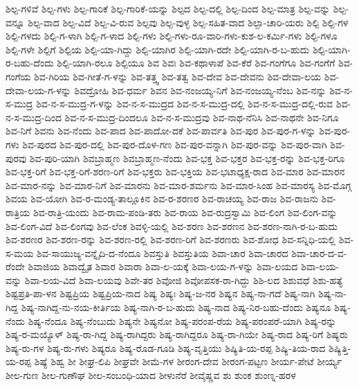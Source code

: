 ಶಿಲ್ಪ-ಗಳಿವೆ
ಶಿಲ್ಪ-ಗಳು
ಶಿಲ್ಪ-ಗಾರಿಕೆ
ಶಿಲ್ಪ-ಗಾರಿಕೆ-ಯನ್ನು
ಶಿಲ್ಪದ
ಶಿಲ್ಪ-ದಲ್ಲಿ
ಶಿಲ್ಪ-ದಿಂದ
ಶಿಲ್ಪ-ಮಾತ್ರ
ಶಿಲ್ಪ-ವನ್ನು
ಶಿಲ್ಪ-ವನ್ನೂ
ಶಿಲ್ಪ-ವಾದ
ಶಿಲ್ಪ-ವಿದೆ
ಶಿಲ್ಪ-ವಿ-ರುವ
ಶಿಲ್ಪವು
ಶಿಲ್ಪ-ವುಳ್ಳ
ಶಿಲ್ಪ-ಸಹಿತ-ವಾದ
ಶಿಲ್ಪಾ-ಚಾರಿ-ಯರು
ಶಿಲ್ಪಿ
ಶಿಲ್ಪಿ-ಗಳ
ಶಿಲ್ಪಿ-ಗಳದು
ಶಿಲ್ಪಿ-ಗ-ಳಾಗಿ
ಶಿಲ್ಪಿ-ಗ-ಳಾದ
ಶಿಲ್ಪಿ-ಗಳು
ಶಿಲ್ಪಿ-ಗಳು-ರೂ-ವಾರಿ-ಗಳು-ಕುಶ-ಲ-ಕರ್ಮಿ-ಗಳು
ಶಿಲ್ಪಿ-ಗಳೂ
ಶಿಲ್ಪಿ-ಗಳೇ
ಶಿಲ್ಪಿಗೆ
ಶಿಲ್ಪಿಯ
ಶಿಲ್ಪಿ-ಯಾ-ಗಿದ್ದು
ಶಿಲ್ಪಿ-ಯಾಗಿರ
ಶಿಲ್ಪಿ-ಯಾಗಿ-ರದೇ
ಶಿಲ್ಪಿ-ಯಾಗಿ-ರ-ಬ-ಹುದು
ಶಿಲ್ಪಿ-ಯಾಗಿ-ರ-ಬಹು-ದೆಂದು
ಶಿಲ್ಪಿ-ಯಾಗಿ-ರಲೂ
ಶಿಲ್ಪಿಯೂ
ಶಿವ
ಶಿವಃ
ಶಿವ-ಕಥಾಳಾಪೆ
ಶಿವ-ಕೆರೆ
ಶಿವ-ಗಂಗೆಗೂ
ಶಿವ-ಗಂಗೆಗೆ
ಶಿವ-ಗಂಗೆಯ
ಶಿವ-ಗಿರಿಯ
ಶಿವ-ಗೀತೆ-ಗ-ಳನ್ನು
ಶಿವ-ತತ್ತ್ವ
ಶಿವ-ತತ್ವ
ಶಿವ-ದೇವ
ಶಿವ-ದೇವನು
ಶಿವ-ದೇವಾ-ಲಯ
ಶಿವ-ದೇವಾ-ಲಯ-ಗ-ಳನ್ನು
ಶಿವದ್ರೋಹಿ
ಶಿವ-ಧರ್ಮ
ಶಿವನ
ಶಿವ-ನಂಜಯ್ಯ-ನಿಗೆ
ಶಿವ-ನಂಜಯ್ಯ-ನೆಂಬ
ಶಿವ-ನನ್ನು
ಶಿವ-ನ-ಸ-ಮುದ್ರ
ಶಿವ-ನ-ಸ-ಮುದ್ರ-ಗ-ಳನ್ನು
ಶಿವ-ನ-ಸ-ಮುದ್ರದ
ಶಿವ-ನ-ಸ-ಮುದ್ರ-ದಲ್ಲಿ
ಶಿವ-ನ-ಸ-ಮುದ್ರ-ದಲ್ಲಿ-ರುವ
ಶಿವ-ನ-ಸ-ಮುದ್ರ-ದಿಂದ
ಶಿವ-ನ-ಸ-ಮುದ್ರ-ದಿಂದಲೂ
ಶಿವ-ನ-ಸ-ಮುದ್ರವು
ಶಿವ-ನಾಥ-ನೆನಿಸಿ
ಶಿವ-ನಾಥನೇ
ಶಿವ-ನಿಗೂ
ಶಿವ-ನಿಗೆ
ಶಿವನು
ಶಿವ-ನೆಂದು
ಶಿವ-ಪಾದ
ಶಿವ-ಪಾದೋ-ದಕೆ
ಶಿವ-ಪಾರ್ವತಿ
ಶಿವ-ಪುರ
ಶಿವ-ಪುರ-ಗ-ಳನ್ನು
ಶಿವ-ಪುರ-ಗಳು
ಶಿವ-ಪುರದ
ಶಿವ-ಪುರ-ದಲ್ಲಿ
ಶಿವ-ಪುರ-ದೊಳ-ಗಣ
ಶಿವ-ಪುರ-ವನ್ನಾಗಿ
ಶಿವ-ಪುರ-ವನ್ನು
ಶಿವ-ಪುರ-ವಾಗಿ
ಶಿವ-ಪುರವು
ಶಿವ-ಪುರಿ-ಯಾಗಿ
ಶಿವಬ್ರಾಹ್ಮಣ
ಶಿವಬ್ರಾಹ್ಮಣ-ನೆಂದು
ಶಿವ-ಭಕ್ತ
ಶಿವ-ಭಕ್ತರ
ಶಿವ-ಭಕ್ತ-ರನ್ನು
ಶಿವ-ಭಕ್ತ-ರಿಗೂ
ಶಿವ-ಭಕ್ತ-ರಿಗೆ
ಶಿವ-ಭಕ್ತ-ರಿಗೆ-ಶರಣ-ರಿಗೆ
ಶಿವ-ಭಕ್ತರು
ಶಿವ-ಭಕ್ತಿಯ
ಶಿವ-ಭಟಾಧ್ಯಕ್ಷ-ರಾದ
ಶಿವ-ಮಾರ
ಶಿವ-ಮಾರನ
ಶಿವ-ಮಾರ-ನನ್ನು
ಶಿವ-ಮಾರ-ನಿಗೆ
ಶಿವ-ಮಾರನು
ಶಿವ-ಮಾರ-ಶರ್ಮನು
ಶಿವ-ಮಾರ-ಸಿಂಹ
ಶಿವ-ಮಾರಸ್ಯ
ಶಿವ-ಮೊಗ್ಗ
ಶಿವಯ
ಶಿವ-ಯೋಗಿ
ಶಿವ-ರ-ಮಂಡ್ಯ-ತಾಲ್ಲೂಕಿನ
ಶಿವ-ರ-ಶರಣರ
ಶಿವ-ರಾಚಯ್ಯ
ಶಿವ-ರಾಜ
ಶಿವ-ರಾಜನು
ಶಿವ-ರಾತ್ರಿಯ
ಶಿವ-ರಾತ್ರಿ-ಯಂದು
ಶಿವ-ರಾಮ-ಪಂಡಿ-ತರು
ಶಿವ-ರಾಯ
ಶಿವ-ರುದ್ರಸ್ವಾಮಿ
ಶಿವ-ಲಿಂಗ
ಶಿವ-ಲಿಂಗ-ವನ್ನು
ಶಿವ-ಲಿಂಗ-ವಿದೆ
ಶಿವ-ಲಿಂಗವು
ಶಿವ-ಲೆಂಕ
ಶಿವಳ್ಳಿ-ಯಲ್ಲಿ
ಶಿವ-ಶರಣ
ಶಿವ-ಶರಣನ
ಶಿವ-ಶರಣ-ನಾಗಿ-ರ-ಬ-ಹುದು
ಶಿವ-ಶರಣರ
ಶಿವ-ಶರಣ-ರನ್ನು
ಶಿವ-ಶರಣ-ರಲ್ಲಿ
ಶಿವ-ಶರಣ-ರಿಗೆ
ಶಿವ-ಶರಣರು
ಶಿವ-ಶೋಧ
ಶಿವ-ಸನ್ನಿಧಿ-ಯಲ್ಲಿ
ಶಿವ-ಸ-ಮಯ
ಶಿವ-ಸಾಯುಜ್ಯ-ವನ್ನೈದಿ-ದ-ನೆಂದೂ
ಶಿವಸ್ತುತಿ
ಶಿವಸ್ತುತಿಯ
ಶಿವಾ-ಚಾರ
ಶಿವಾ-ಚಾರದ
ಶಿವಾ-ಚಾರ-ದ-ವ-ರೆಂದೇ
ಶಿವಾಜಿಯ
ಶಿವಾದ್ವೈತ
ಶಿವಾರ
ಶಿವಾರಾ
ಶಿವಾ-ಲ-ಯಕ್ಕೆ
ಶಿವಾ-ಲಯ-ಗ-ಳನ್ನು
ಶಿವಾ-ಲಯದ
ಶಿವಾ-ಲಯ-ವನ್ನು
ಶಿವಾ-ಲಯ-ವಿದೆ
ಶಿವಾ-ಲಯವು
ಶಿವೇ-ತರ
ಶಿವೋಜಿ
ಶಿವೋಪಸಕ-ರಾ-ಗಿದ್ದು
ಶಿಶಿ-ಲದ
ಶಿಶುವಧೆ
ಶಿಶು-ಹತ್ಯೆ
ಶಿಷ್ಟಪ್ರತಿ-ಪಾ-ಳನ
ಶಿಷ್ಟಪ್ರಿಯ
ಶಿಷ್ಟಪ್ರಿಯ-ನಾದ
ಶಿಷ್ಯ
ಶಿಷ್ಯಃ
ಶಿಷ್ಯ-ಜ-ನರ
ಶಿಷ್ಯನ
ಶಿಷ್ಯ-ನಾ-ಗದೆ
ಶಿಷ್ಯ-ನಾಗಿ
ಶಿಷ್ಯ-ನಾ-ಗಿದ್ದ
ಶಿಷ್ಯ-ನಾಗಿದ್ದ-ನು-ನಯ-ಕೀರ್ತಿಯ
ಶಿಷ್ಯ-ನಾಗಿ-ರ-ಬ-ಹುದು
ಶಿಷ್ಯ-ನಾದ
ಶಿಷ್ಯ-ನಿರ-ಬಹು-ದೆಂದು
ಶಿಷ್ಯನೂ
ಶಿಷ್ಯ-ನೆಂದು
ಶಿಷ್ಯ-ನೆಂದೂ
ಶಿಷ್ಯ-ನೆಂಬುದು
ಶಿಷ್ಯನೇ
ಶಿಷ್ಯನೋ
ಶಿಷ್ಯ-ಪರಂಪ-ರೆಯ
ಶಿಷ್ಯ-ಪರಂಪರೆ-ಯಾಗಿ
ಶಿಷ್ಯ-ರನ್ನು
ಶಿಷ್ಯ-ರ-ಮಯ್ಯೊಳ್
ಶಿಷ್ಯ-ರಾ-ಗಿದ್ದ
ಶಿಷ್ಯ-ರಾಗಿದ್ದರು
ಶಿಷ್ಯ-ರಾಗಿದ್ದರೂ
ಶಿಷ್ಯ-ರಾ-ಗಿಯೇ
ಶಿಷ್ಯ-ರಾದ
ಶಿಷ್ಯ-ರಿಗೆ
ಶಿಷ್ಯರು
ಶಿಷ್ಯ-ರು-ಗಳ
ಶಿಷ್ಯ-ರು-ಗಳು
ಶಿಷ್ಯರೂ
ಶಿಷ್ಯ-ರೊಡ-ಗೂಡಿ
ಶಿಷ್ಯ-ವೃತ್ತಿಯು
ಶಿಷ್ಯಿತಿ-ಯ-ರಪ್ಪ
ಶಿಷ್ಯಿ-ತಿಯ-ರಾದ
ಶಿಷ್ಯಿತ್ತಿ-ಯ-ರಪ್ಪ
ಶಿಷ್ಯೆ
ಶಿಹ್ವ
ಶೀ
ಶೀಘ್ರ-ಲಿಪಿ
ಶೀಘ್ರವೇ
ಶೀಮೆ-ಗಳ
ಶೀರಂಗ-ದೇವ
ಶೀರಂಗ-ಪಟ್ಟಣ
ಶೀರ್ಯ-ಪೇಟೆ
ಶೀರ್ಯ್ಯ
ಶೀಲ-ಗುಣ
ಶೀಲ-ಗುಣೌಘ
ಶೀಲ-ಸಂಬಂಧಿ-ಯಾದ
ಶೀಳುನೆರೆ
ಶೀವೈಷ್ಣವ
ಶು
ಶುಂಕ
ಶುಂಣ್ನ-ಹರಳ
